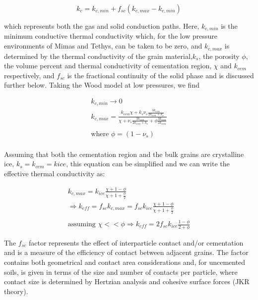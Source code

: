 \documentclass[11pt]{article} %
\begin{document}
	\begin{equation}
	k_{c} = k_{c,min} +f_{sc}(k_{c,max}-k_{c,min})
	\end{equation}
	
	which represents both the gas and solid conduction paths. Here, $k_{c,min}$ is the minimum conductive thermal conductivity which, for the low pressure environments of Mimas and Tethys, can be taken to be zero, and $k_{c,max}$ is determined by the thermal conductivity of the grain material,$ k_{s}$, the porosity $\phi$, the volume percent and thermal conductivity of cementation region, $\chi$ and $k_{cem}$ respectively, and  $f_{sc}$ is the fractional continuity of the solid phase and is discussed further below. Taking the Wood model at low pressures, we find
	
	\begin{equation}
	\begin{gathered}
	k_{c,min} \rightarrow 0 \\
	k_{c,max} = \frac{k_{cem}\chi + k_{s}\nu_{s}\frac{3k_{cem}}{2k_{cem}+k_{s}}}{\chi +\nu_{s}\frac{3k_{cem}}{2k_{cem}+k_{s}}+\phi\frac{3k_{cem}}{2k_{cem}}} \\
	\\
	\text{where  } \phi = (1-\nu_{s})\\ 
	\end{gathered}
	\end{equation}

	Assuming that both the cementation region and the bulk grains are crystalline ice, $k_{s} = k_{cem} = k{ice}$, this equation can be simplified and we can write the effective thermal conductivity as:
	
	\begin{equation}
	\begin{gathered}
	k_{c,max} = k_{ice} \frac{\chi + 1 - \phi}{\chi + 1 + \frac{\phi}{2}} \\
	\Rightarrow k_{eff} = f_{sc} k_{c,max} = f_{sc} k_{ice} \frac{\chi + 1 - \phi}{\chi + 1 + \frac{\phi}{2}} \\
	\\
	\text{assuming   } \chi << \phi  \Rightarrow k_{eff}=2 f_{sc} k_{ice} \frac{1-\phi}{2+\phi}
	\end{gathered}
	\end{equation}
	
	The $f_{sc}$ factor represents the effect of interparticle contact and/or cementation and is a measure of the efficiency of contact between adjacent grains. The factor contains both geometrical and contact area considerations and, for uncemented soils, is given in terms of the size and number of contacts per particle, where contact size is determined by Hertzian analysis and cohesive surface forces (JKR theory).
	
\end{document}
